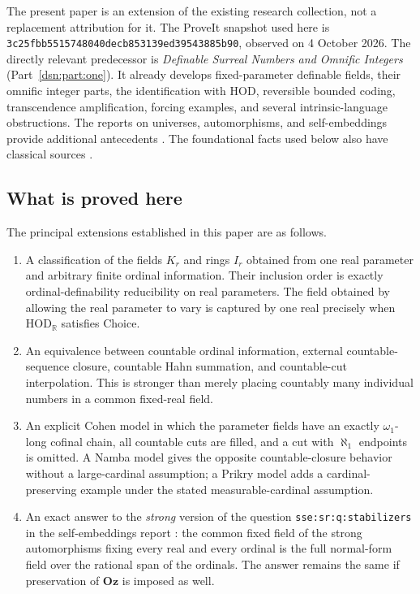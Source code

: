 \documentclass[11pt,a4paper]{article}
\numberwithin{equation}{section}
\theoremstyle{definition}
\theoremstyle{remark}
\newcommand{\Oz}{\mathbf{Oz}}
\newcommand{\HOD}{\mathrm{HOD}}
\newcommand{\R}{\mathbb R}
\newcommand{\HR}{\HOD_{\R}}
\begin{document}
The present paper is an extension of the existing research collection,
not a replacement attribution for it. The ProveIt snapshot used here is
\texttt{3c25fbb5515748040decb853139ed39543885b90}, observed on 4 October 2026. The directly relevant predecessor is
\emph{Definable Surreal Numbers and Omnific Integers}
(Part~\ref{dsn:part:one}). It already develops fixed-parameter definable fields,
their omnific integer parts, the identification with $\HOD$, reversible
bounded coding, transcendence amplification, forcing examples, and
several intrinsic-language obstructions. The reports on universes,
automorphisms, and self-embeddings provide additional antecedents
\cite{RepoUniv,RepoOpa,RepoSse}. The foundational facts used below
also have classical sources \cite{Conway,Gonshor,vdDE,DoraisHamkins}.

\subsection{What is proved here}

The principal extensions established in this paper are as follows.

\begin{enumerate}
\item A classification of the fields $K_r$ and rings $I_r$ obtained from
one real parameter and arbitrary finite ordinal information. Their
inclusion order is exactly ordinal-definability reducibility on real
parameters. The field obtained by allowing the real parameter to vary is
captured by one real precisely when $\HR$ satisfies Choice.
\item An equivalence between countable ordinal information, external
countable-sequence closure, countable Hahn summation, and countable-cut
interpolation. This is stronger than merely placing countably many
individual numbers in a common fixed-real field.
\item An explicit Cohen model in which the parameter fields have an
exactly $\omega_1$-long cofinal chain, all countable cuts are filled, and a
cut with $\aleph_1$ endpoints is omitted. A Namba model gives the opposite countable-closure behavior without
a large-cardinal assumption; a Prikry model adds a cardinal-preserving
example under the stated measurable-cardinal assumption.
\item An exact answer to the \emph{strong} version of the question
\texttt{sse:sr:q:stabilizers} in the self-embeddings report
\cite{RepoSse}: the common fixed field of the strong automorphisms
fixing every real and every ordinal is the full normal-form field over
the rational span of the ordinals. The answer remains the same if
preservation of $\Oz$ is imposed as well.
\end{enumerate}
\end{document}
